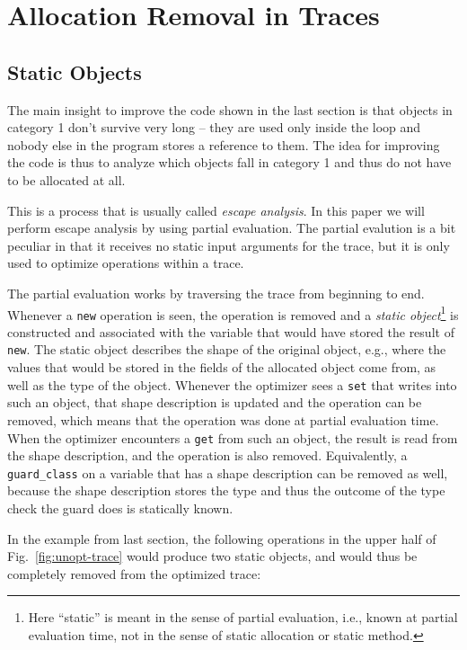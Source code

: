 \documentclass[preprint]{sigplanconf}
\newcommand\ie{i.e.,\xspace}
\newcommand\eg{e.g.,\xspace}
\begin{document}
\section{Allocation Removal in Traces}
\label{sec:statics}

\subsection{Static Objects}

The main insight to improve the code shown in the last section is that objects
in category 1 don't survive very long -- they are used only inside the loop and
nobody else in the program stores a reference to them. The idea for improving
the code is thus to analyze which objects fall in category 1 and thus do
not have to be allocated at all.

This is a process that is usually called \emph{escape analysis}. In this paper we will
perform escape analysis by using partial evaluation. The partial evalution is a
bit peculiar in that it receives no static input arguments for the trace,
but it is only used to optimize operations within a trace.

The partial evaluation works by traversing the trace from beginning to end.
Whenever a \lstinline{new} operation is seen, the operation is removed and a \emph{static
object}\footnote{Here ``static'' is meant in the sense of partial
evaluation, \ie known at partial evaluation time, not in the sense of static
allocation or static method.} is constructed and associated with the variable
that would have stored
the result of \lstinline{new}. The static object describes the shape of the
original object, \eg where the values that would be stored in the fields of the
allocated object come from, as well as the type of the object. Whenever the
optimizer sees a \lstinline{set} that writes into such an object, that shape
description is updated and the operation can be removed, which means that the
operation was done at partial evaluation time. When the optimizer encounters a
\lstinline{get} from such an object, the result is read from the shape
description, and the operation is also removed. Equivalently, a
\lstinline{guard_class} on a variable that has a shape description can be removed
as well, because the shape description stores the type and thus the outcome of
the type check the guard does is statically known.

In the example from last section, the following operations in the upper half
of Fig.~\ref{fig:unopt-trace} would produce two
static objects, and would thus be completely removed from the optimized trace:
\end{document}

